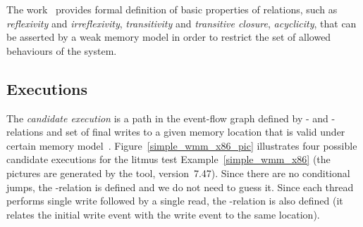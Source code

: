 The work~\cite[Chapter~2]{alglave2010shared} provides formal definition of basic properties of relations, such as \textit{reflexivity} and \textit{irreflexivity}, \textit{transitivity} and \textit{transitive closure}, \textit{acyclicity}, that can be asserted by a weak memory model in order to restrict the set of allowed behaviours of the system.


\subsection{Executions}
\label{ch:wmm:model:executions}

The \textit{candidate execution} is a path in the event-flow graph defined by \po- and \rf-relations and set of final writes to a given memory location that is valid under certain memory model~\cite{alglave2014herding}. %
Figure~\ref{simple_wmm_x86_pic} illustrates four possible candidate executions for the litmus test Example~\ref{simple_wmm_x86} (the pictures are generated by the  tool, version~7.47).
Since there are no conditional jumps, the \po-relation is defined and we do not need to guess it.
Since each thread performs single write followed by a single read, the \co-relation is also defined (it relates the initial write event with the write event to the same location).
